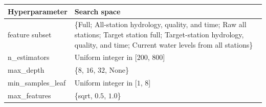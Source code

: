 \begin{tabularx}{\textwidth}{@{}lX@{}}
\toprule
\textbf{Hyperparameter} & \textbf{Search space} \\
\midrule
feature subset & \{Full; All-station hydrology, quality, and time; Raw all stations; Target station full; Target-station hydrology, quality, and time; Current water levels from all stations\} \\
\addlinespace
n\_estimators & Uniform integer in [$200$, $800$] \\
\addlinespace
max\_depth & \{$8$, $16$, $32$, None\} \\
\addlinespace
min\_samples\_leaf & Uniform integer in [$1$, $8$] \\
\addlinespace
max\_features & \{sqrt, $0.5$, $1.0$\} \\
\bottomrule
\end{tabularx}
